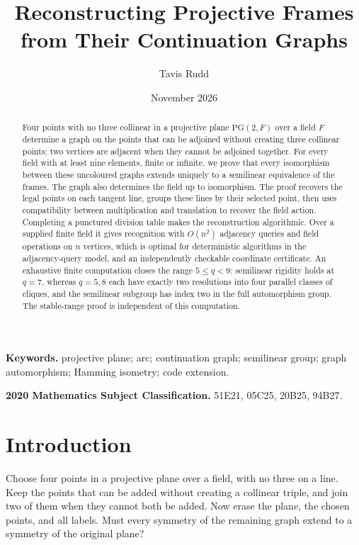 \documentclass[11pt]{article}
\title{Reconstructing Projective Frames from Their Continuation Graphs}
\author{Tavis Rudd}
\date{November 2026}
\theoremstyle{definition}
\theoremstyle{remark}
\newcommand{\PG}{\mathrm{PG}}
\begin{document}
\maketitle

\begin{abstract}
Four points with no three collinear in a projective plane $\PG(2,F)$
over a field $F$ determine a graph on the points that can
be adjoined without creating three collinear points; two vertices are
adjacent when they cannot be adjoined together. For every field with at
least nine elements, finite or infinite, we prove that every isomorphism
between these uncoloured graphs extends uniquely to a semilinear
equivalence of the frames. The graph also determines the field up to
isomorphism.
The proof recovers the legal points on each tangent line, groups these
lines by their selected point, then uses
compatibility between multiplication and translation to recover the field
action. Completing a punctured division table makes the reconstruction
algorithmic. Over a supplied finite field it gives recognition with
$O(n^2)$ adjacency queries and field operations on $n$ vertices, which
is optimal for deterministic algorithms in the adjacency-query model, and
an independently checkable
coordinate certificate.
An exhaustive finite computation closes the range $5\le q<9$:
semilinear rigidity holds at $q=7$, whereas $q=5,8$ each have exactly
two resolutions into four parallel classes of cliques, and the
semilinear subgroup has index two in the full automorphism group.
The stable-range proof is independent of this computation.
\end{abstract}

\noindent\textbf{Keywords.} projective plane; arc; continuation
graph; semilinear group; graph automorphism; Hamming isometry; code extension.

\smallskip
\noindent\textbf{2020 Mathematics Subject Classification.} 51E21, 05C25,
20B25, 94B27.

\section{Introduction}

Choose four points in a projective plane over a field, with no three on a line.
Keep the points that can be added without creating a collinear triple,
and join two of them when they cannot both be added. Now erase the plane,
the chosen points, and all labels. Must every symmetry of the remaining
graph extend to a symmetry of the original plane?
\end{document}

